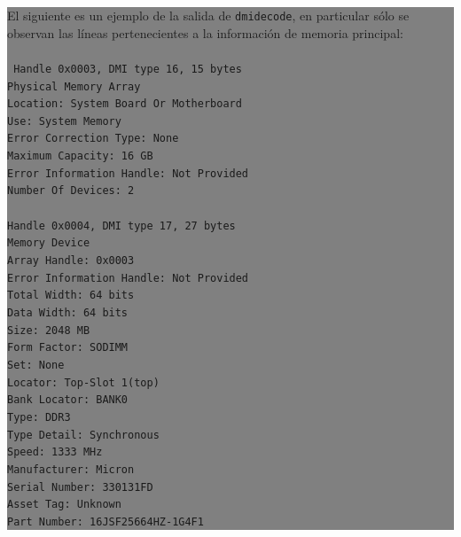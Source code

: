 \documentclass[12pt]{article}
\begin{document}
\colorbox{grey}{\parbox[t]{0.95\linewidth}{ \vspace*{0.5cm} { 
El siguiente es un ejemplo de la salida de \texttt{dmidecode}, en 
particular sólo se observan las líneas pertenecientes a la 
información de memoria principal: \\ 
\\ 
{\tt
Handle 0x0003, DMI type 16, 15 bytes\\
Physical Memory Array\\
	Location: System Board Or Motherboard\\
	Use: System Memory\\
	Error Correction Type: None\\
	Maximum Capacity: 16 GB\\
	Error Information Handle: Not Provided\\
	Number Of Devices: 2\\
\\
Handle 0x0004, DMI type 17, 27 bytes\\
Memory Device\\
	Array Handle: 0x0003\\
	Error Information Handle: Not Provided\\
	Total Width: 64 bits\\
	Data Width: 64 bits\\
	Size: 2048 MB\\
	Form Factor: SODIMM\\
	Set: None\\
	Locator: Top-Slot 1(top)\\
	Bank Locator: BANK0\\
	Type: DDR3\\
	Type Detail: Synchronous\\
	Speed: 1333 MHz\\
	Manufacturer: Micron\\
	Serial Number: 330131FD\\
	Asset Tag: Unknown\\
	Part Number: 16JSF25664HZ-1G4F1\\
}
} \vspace*{0.5cm} } } 
\end{document}
